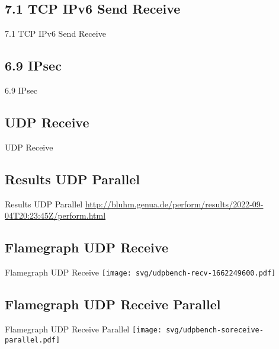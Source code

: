 \documentclass[14pt,aspectratio=169]{beamer}
\begin{document}
\subsection{7.1 TCP IPv6 Send Receive}
\begin{frame}{7.1 TCP IPv6 Send Receive}
    \begin{adjustbox}{totalheight=\baselineskip}
	
    \end{adjustbox}
\end{frame}

\subsection{6.9 IPsec}
\begin{frame}{6.9 IPsec}
    \begin{adjustbox}{totalheight=\baselineskip}
	
    \end{adjustbox}
\end{frame}

\subsection{UDP Receive}
\begin{frame}{UDP Receive}
    \begin{adjustbox}{totalheight=\baselineskip}
	
    \end{adjustbox}
\end{frame}

\subsection{Results UDP Parallel}
\begin{frame}{Results UDP Parallel}
    \url{
    http://bluhm.genua.de/perform/results/2022-09-04T20:23:45Z/perform.html}
\end{frame}

\subsection{Flamegraph UDP Receive}
\begin{frame}{Flamegraph UDP Receive}
    \texttt{[image: svg/udpbench-recv-1662249600.pdf]}
\end{frame}

\subsection{Flamegraph UDP Receive Parallel}
\begin{frame}{Flamegraph UDP Receive Parallel}
    \texttt{[image: svg/udpbench-soreceive-parallel.pdf]}
\end{frame}
\end{document}
